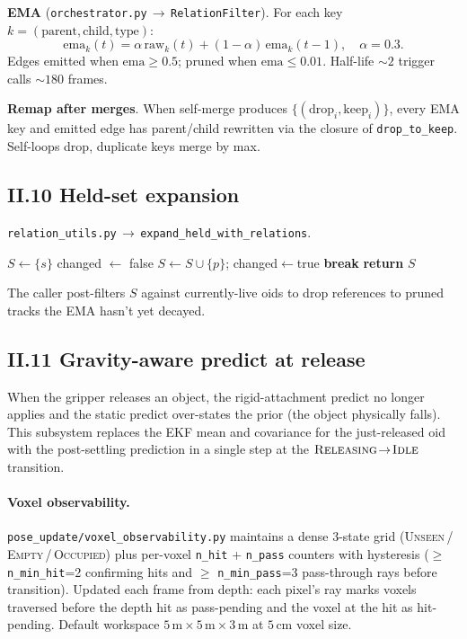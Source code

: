 \documentclass[11pt]{article}
\newcommand{\file}[1]{\texttt{#1}}
\begin{document}
\textbf{EMA}
(\file{orchestrator.py}\,$\to$\,\texttt{RelationFilter}). For each
key $k=(\text{parent},\text{child},\text{type})$:
$$\mathrm{ema}_k(t) = \alpha\,\mathrm{raw}_k(t) + (1-\alpha)\,\mathrm{ema}_k(t-1),\quad \alpha=0.3.$$
Edges emitted when $\mathrm{ema}\ge 0.5$; pruned when
$\mathrm{ema}\le 0.01$. Half-life $\sim 2$ trigger calls
$\sim 180$ frames.

\textbf{Remap after merges}. When self-merge produces
$\{(\text{drop}_i,\text{keep}_i)\}$, every EMA key and emitted edge
has parent/child rewritten via the closure of \texttt{drop\_to\_keep}.
Self-loops drop, duplicate keys merge by max.

\subsection*{II.10 Held-set expansion}\label{sec:held}

\file{relation\_utils.py}\,$\to$\,\texttt{expand\_held\_with\_relations}.

\begin{algorithm}[H]
\begin{algorithmic}[1]
\State $S \gets \{s\}$
  \State changed $\gets$ false
     $S \gets S\cup\{p\}$; changed$\gets$true \EndIf
  \EndFor
   \textbf{break} \EndIf
\EndFor
\State \textbf{return} $S$
\end{algorithmic}
\end{algorithm}
The caller post-filters $S$ against currently-live oids to drop
references to pruned tracks the EMA hasn't yet decayed.

\subsection*{II.11 Gravity-aware predict at release}\label{sec:gravity}

When the gripper releases an object, the rigid-attachment predict no
longer applies and the static predict over-states the prior (the
object physically falls). This subsystem replaces the EKF mean and
covariance for the just-released oid with the post-settling
prediction in a single step at the
$\textsc{Releasing}\!\to\!\textsc{Idle}$ transition.

\paragraph{Voxel observability.}
\file{pose\_update/voxel\_observability.py} maintains a dense 3-state
grid (\textsc{Unseen}\,/\,\textsc{Empty}\,/\,\textsc{Occupied}) plus
per-voxel \texttt{n\_hit} + \texttt{n\_pass} counters with hysteresis
($\ge $ \texttt{n\_min\_hit}=2 confirming hits and $\ge $
\texttt{n\_min\_pass}=3 pass-through rays before transition). Updated
each frame from depth: each pixel's ray marks voxels traversed before
the depth hit as pass-pending and the voxel at the hit as
hit-pending. Default workspace $5\,\text{m}\times 5\,\text{m}\times
3\,\text{m}$ at $5\,\text{cm}$ voxel size.
\end{document}
